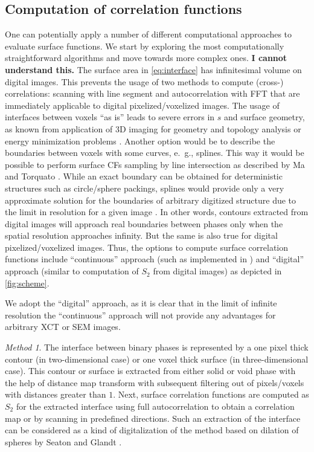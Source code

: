\documentclass[reprint,amsmath,amssymb,aps,pre]{revtex4-1}
\begin{document}
\subsection{Computation of correlation functions}
One can potentially apply a number of different computational approaches to
evaluate surface functions. We start by exploring the most computationally
straightforward algorithms and move towards more complex ones. \textbf{I cannot
 understand this.} The surface area
in \cref{eq:interface} has infinitesimal volume on digital images. This prevents
the usage of two methods to compute (cross-) correlations: scanning with line
segment and autocorrelation with FFT that are immediately applicable to digital
pixelized/voxelized images. The usage of interfaces between voxels ``as is''
leads to severe errors in $s$ and surface geometry, as known from application of
3D imaging for geometry and topology analysis \cite{AWR_PNM} or energy
minimization problems \cite{jagged_surfaces}. Another option would be to
describe the boundaries between voxels with some curves, e.~g., splines. This
way it would be possible to perform surface CFs sampling by line intersection as
described by Ma and Torquato \cite{Ma_Torq}. While an exact boundary can be
obtained for deterministic structures such as circle/sphere packings, splines
would provide only a very approximate solution for the boundaries of arbitrary
digitized structure due to the limit in resolution for a given image
\cite{Eusosoil2012}. In other words, contours extracted from digital images will
approach real boundaries between phases only when the spatial resolution
approaches infinity. But the same is also true for digital pixelized/voxelized
images. Thus, the options to compute surface correlation functions include
``continuous'' approach (such as implemented in \cite{Ma_Torq}) and ``digital''
approach (similar to computation of $S_2$ from digital images) as depicted in
\cref{fig:scheme}.

We adopt the ``digital'' approach, as it is clear that in the limit of infinite
resolution the ``continuous'' approach will not provide any advantages for
arbitrary XCT or SEM images.


\textit{Method 1}. The interface between binary phases is represented by a one
pixel thick contour (in two-dimensional case) or one voxel thick surface (in
three-dimensional case). This contour or surface is extracted from either solid
or void phase with the help of distance map transform with subsequent filtering
out of pixels/voxels with distances greater than $1$. Next, surface correlation
functions are computed as $S_2$ for the extracted interface using full
autocorrelation to obtain a correlation map or by scanning in predefined
directions. Such an extraction of the interface can be considered as a kind of
digitalization of the method based on dilation of spheres by Seaton and Glandt
\cite{SG1986}.
\end{document}
